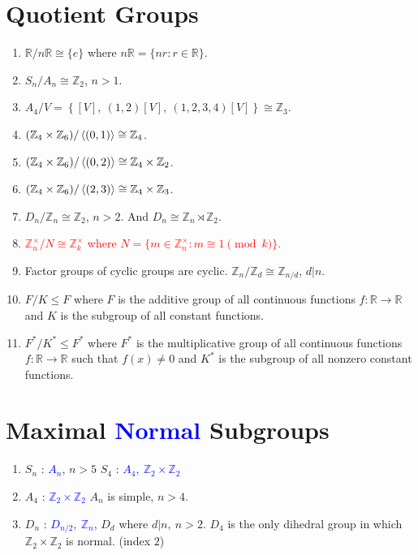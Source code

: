 \section{Quotient Groups}
\begin{enumerate}
	\item $\mathbb{R}/n\mathbb{R} \cong \{ e \}$ where $n\mathbb{R} = \{ nr : r \in \mathbb{R} \}$.
	\item $S_n/A_n \cong \mathbb{Z}_2$, $n>1$.
	\item $A_4/V  = \left\{ [V],\ (1,2)[V],\ (1,2,3,4)[V] \right\} \cong \mathbb{Z}_3$.
	\item $(\mathbb{Z}_4 \times \mathbb{Z}_6)/\left\langle (0,1) \right\rangle \cong \mathbb{Z}_4$.
	\item $(\mathbb{Z}_4 \times \mathbb{Z}_6)/\left\langle (0,2) \right\rangle \cong \mathbb{Z}_4 \times \mathbb{Z}_2$.
	\item $(\mathbb{Z}_4 \times \mathbb{Z}_6)/\left\langle (2,3) \right\rangle \cong \mathbb{Z}_4 \times \mathbb{Z}_3$.
	\item $D_n/\mathbb{Z}_n \cong \mathbb{Z}_2$, $n>2$. And $D_n \cong \mathbb{Z}_n \rtimes \mathbb{Z}_2$.
	\item \textcolor{red}{$\mathbb{Z}_n^\times/N \cong \mathbb{Z}_k^\times$ where $N = \{ m \in \mathbb{Z}_n^\times : m \cong 1 \pmod{k} \}$.}
	\item Factor groups of cyclic groups are cyclic. $\mathbb{Z}_n/\mathbb{Z}_d \cong \mathbb{Z}_{n/d}$, $d|n$.
	\item $F/K \le F$ where $F$ is the additive group of all continuous functions $f : \mathbb{R} \to \mathbb{R}$ and $K$ is the subgroup of all constant functions.
	\item $F^\ast/K^\ast \le F^\ast$ where $F^\ast$ is the multiplicative group of all continuous functions $f : \mathbb{R} \to \mathbb{R}$ such that $f(x) \ne 0$ and $K^\ast$ is the subgroup of all nonzero constant functions.
\end{enumerate}

\section{Maximal \textcolor{blue}{Normal} Subgroups}
\begin{enumerate}
	\item $S_n$ : \textcolor{blue}{$A_n$}, $n > 5$
		\subitem $S_4$ : \textcolor{blue}{$A_4,\ \mathbb{Z}_2 \times \mathbb{Z}_2$}
	\item $A_4$ : \textcolor{blue}{$\mathbb{Z}_2 \times \mathbb{Z}_2$}
		\subitem $A_n$ is simple, $n > 4$.
	\item $D_n$ : \textcolor{blue}{$D_{n/2},\ \mathbb{Z}_n$}, $D_d$ where $d|n,\ n>2$.
		\subitem $D_4$ is the only dihedral group in which $\mathbb{Z}_2 \times \mathbb{Z}_2$ is normal. (index $2$)
\end{enumerate}

